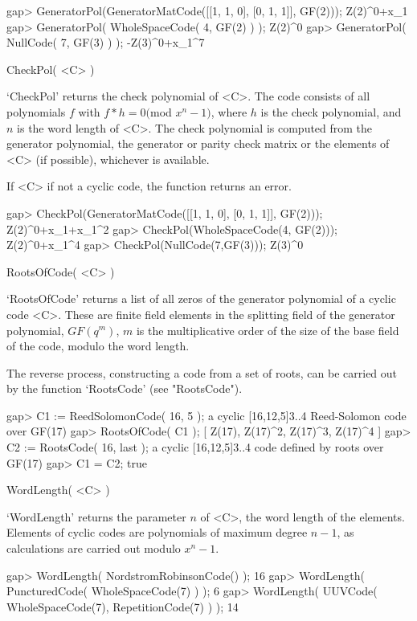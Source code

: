 \beginexample
gap> GeneratorPol(GeneratorMatCode([[1, 1, 0], [0, 1, 1]], GF(2)));
Z(2)^0+x_1
gap> GeneratorPol( WholeSpaceCode( 4, GF(2) ) );
Z(2)^0
gap> GeneratorPol( NullCode( 7, GF(3) ) );
-Z(3)^0+x_1^7
\endexample

\>CheckPol( <C> )

`CheckPol' returns the check polynomial of  <C>. The code consists of all
polynomials $f$ with  $f*h = 0 ($mod  $x^n-1)$, where $h$  is the check
polynomial, and $n$ is the  word length of  <C>. The check polynomial  is
computed  from  the generator polynomial, the   generator or parity check
matrix or the elements of <C> (if possible), whichever is available.

If <C> if not a cyclic code, the function returns an error.

\beginexample
gap> CheckPol(GeneratorMatCode([[1, 1, 0], [0, 1, 1]], GF(2)));
Z(2)^0+x_1+x_1^2
gap> CheckPol(WholeSpaceCode(4, GF(2)));
Z(2)^0+x_1^4
gap> CheckPol(NullCode(7,GF(3)));
Z(3)^0
\endexample

\>RootsOfCode( <C> )

`RootsOfCode' returns a list of all zeros of  the generator polynomial of
a cyclic code <C>. These are finite field elements in the splitting field
of the generator  polynomial, $GF(q^m)$, $m$  is the multiplicative order
of the size of the base field of the code, modulo the word length.

The reverse  process, constructing  a code from  a set  of roots,  can  be
carried out by the function `RootsCode' (see "RootsCode").

\beginexample
gap> C1 := ReedSolomonCode( 16, 5 );
a cyclic [16,12,5]3..4 Reed-Solomon code over GF(17)
gap> RootsOfCode( C1 );
[ Z(17), Z(17)^2, Z(17)^3, Z(17)^4 ]
gap> C2 := RootsCode( 16, last );
a cyclic [16,12,5]3..4 code defined by roots over GF(17)
gap> C1 = C2;
true 
\endexample


\>WordLength( <C> )

`WordLength' returns the  parameter $n$ of  <C>,  the word length of  the
elements. Elements of  cyclic   codes are polynomials of   maximum degree
$n-1$, as calculations are carried out modulo $x^{n}-1$.

\beginexample
gap> WordLength( NordstromRobinsonCode() );
16
gap> WordLength( PuncturedCode( WholeSpaceCode(7) ) );
6
gap> WordLength( UUVCode( WholeSpaceCode(7), RepetitionCode(7) ) );
14 
\endexample

